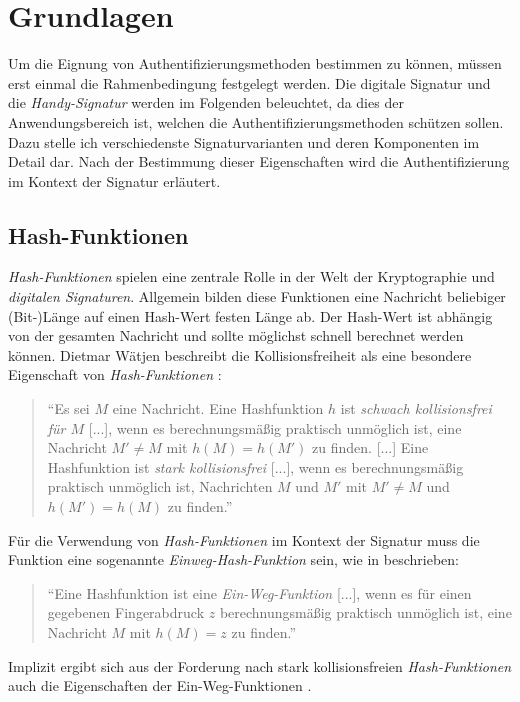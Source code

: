 \documentclass[11pt,a4paper,ngerman]{scrreprt}
\begin{document}
\chapter{Grundlagen}
Um die Eignung von Authentifizierungsmethoden bestimmen zu können, müssen erst einmal die Rahmenbedingung festgelegt werden. Die digitale Signatur und die \textit{Handy-Signatur} werden im Folgenden beleuchtet, da dies der Anwendungsbereich ist, welchen die Authentifizierungsmethoden schützen sollen. Dazu stelle ich verschiedenste Signaturvarianten und deren Komponenten im Detail dar. Nach der Bestimmung dieser Eigenschaften wird die Authentifizierung im Kontext der Signatur erläutert.

\section{Hash-Funktionen}\label{sec:Hash-Funktionen}
\textit{Hash-Funktionen} spielen eine zentrale Rolle in der Welt der Kryptographie und \textit{digitalen Signaturen}. Allgemein bilden diese Funktionen eine Nachricht beliebiger (Bit-)Länge auf einen Hash-Wert festen Länge ab. Der Hash-Wert ist abhängig von der gesamten Nachricht und sollte möglichst schnell berechnet werden können. Dietmar Wätjen beschreibt die Kollisionsfreiheit als eine besondere Eigenschaft von \textit{Hash-Funktionen} \cite[S. 89]{krypt08}: 
\begin{quote}
    ``Es sei $M$ eine Nachricht. Eine Hashfunktion $h$ ist \emph{schwach kollisionsfrei für $M$} [...], wenn es berechnungsmäßig praktisch unmöglich ist, eine Nachricht $M' \neq M$ mit $h(M) = h(M')$ zu finden. [...]
    Eine Hashfunktion ist \emph{stark kollisionsfrei} [...], wenn es berechnungsmäßig praktisch unmöglich ist, Nachrichten $M$ und $M'$ mit $M' \neq M$ und $h(M') = h(M)$ zu finden.''
\end{quote}
Für die Verwendung von \emph{Hash-Funktionen} im Kontext der Signatur muss die Funktion eine sogenannte \emph{Einweg-Hash-Funktion} sein, wie in \cite[S. 99]{krypt08} beschrieben:
\begin{quote}
    ``Eine Hashfunktion ist eine \emph{Ein-Weg-Funktion} [...], wenn es für einen gegebenen Fingerabdruck $z$ berechnungsmäßig praktisch unmöglich ist, eine Nachricht $M$ mit $h(M)=z$ zu finden.''
\end{quote}
Implizit ergibt sich aus der Forderung nach stark kollisionsfreien \textit{Hash-Funktionen} auch die Eigenschaften der Ein-Weg-Funktionen \cite[S. 99]{krypt08}.
\end{document}
